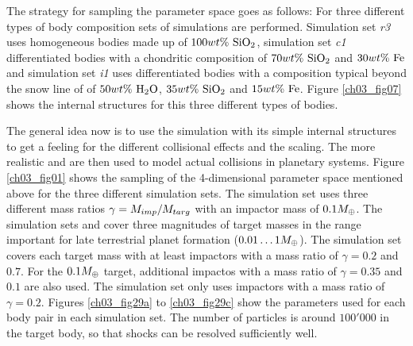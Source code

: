 The strategy for sampling the parameter space goes as follows: For three different types of body composition sets of simulations are performed. Simulation set \emph{r3} uses homogeneous bodies made up of $100 wt\mathrm{\%}~\mathrm{SiO}_2$, simulation set \emph{c1} differentiated bodies with a chondritic composition of $70 wt\mathrm{\%}~\mathrm{SiO}_2$ and $30 wt\mathrm{\%}~\mathrm{Fe}$ and simulation set \emph{i1} uses differentiated bodies with a composition typical beyond the snow line of of $50 wt\mathrm{\%}~\mathrm{H}_2 \mathrm{O}$, $35 wt\mathrm{\%}~\mathrm{SiO}_2$ and $15 wt\mathrm{\%}~\mathrm{Fe}$. Figure \ref{ch03_fig07} shows the internal structures for this three different types of bodies.

The general idea now is to use the \rss simulation with its simple internal structures to get a feeling for the different collisional effects and the scaling. The more realistic \css and \iss are then used to model actual collisions in planetary systems. Figure \ref{ch03_fig01} shows the sampling of the 4-dimensional parameter space mentioned above for the three different simulation sets.  The \rss simulation set uses three different mass ratios $\gamma = M_{imp} / M_{targ}$ with an impactor mass of $0.1 M_{\oplus}$. The simulation sets \css and \iss cover three magnitudes of target masses in the range important for late terrestrial planet formation ($0.01 \dots 1 M_{\oplus}$). The \css simulation set covers each target mass with at least impactors with a mass ratio of $\gamma = 0.2$ and  $0.7$. For the $0.1 M_{\oplus}$ target, additional impactos with a mass ratio of $\gamma = 0.35$ and $0.1$ are also used. The \iss simulation set only uses impactors with a mass ratio of $\gamma = 0.2$. Figures \ref{ch03_fig29a} to \ref{ch03_fig29c} show the parameters used for each body pair in each simulation set. The number of particles is around $100'000$ in the target body, so that shocks can be resolved sufficiently well.

